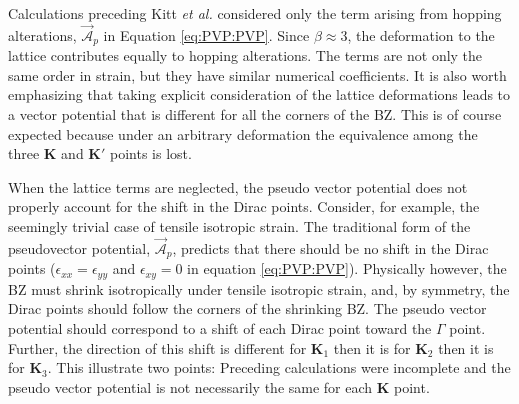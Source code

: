 Calculations preceding Kitt \textit{et al.} \cite{Kitt2012} considered only the term arising from hopping alterations, $\vec{\mathcal{A}}_p$ in Equation \ref{eq:PVP:PVP}.
Since $\beta \approx 3$, the deformation to the lattice contributes equally to hopping alterations.
The terms are not only the same order in strain, but they have similar numerical coefficients.
It is also worth emphasizing that taking explicit consideration of the lattice deformations leads to a vector potential that is different for all the corners of the BZ.
This is of course expected because under an arbitrary deformation the equivalence among the three $\bm{K}$ and $\bm{K'}$ points is lost.

When the lattice terms are neglected, the pseudo vector potential does not properly account for the shift in the Dirac points.
Consider, for example, the seemingly trivial case of tensile isotropic strain.
The traditional form of the pseudovector potential, $\vec{\mathcal{A}}_p$, predicts that there should be no shift in the Dirac points ($\epsilon_{xx}=\epsilon_{yy}$ and $\epsilon_{xy}=0$ in equation \ref{eq:PVP:PVP}).
Physically however, the BZ must shrink isotropically under tensile isotropic strain, and, by symmetry, the Dirac points should follow the corners of the shrinking BZ.
The pseudo vector potential should correspond to a shift of each Dirac point toward the $\Gamma$ point.
Further, the direction of this shift is different for $\bm{K}_1$ then it is for $\bm{K}_2$ then it is for $\bm{K}_3$. 
This illustrate two points: Preceding calculations were incomplete and the pseudo vector potential is not necessarily the same for each $\bm{K}$ point.

